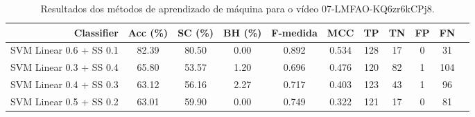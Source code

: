 \begin{table}[!htb]
\centering
\caption{Resultados dos métodos de aprendizado de máquina para o vídeo 07-LMFAO-KQ6zr6kCPj8.}
\label{tab:07-LMFAO-KQ6zr6kCPj8}
\begin{tabular}{r|c|c|c|c|c|c|c|c|c|c}
\hline\hline
Classifier & Acc (\%) & SC (\%) & BH (\%) & F-medida & MCC & TP & TN & FP & FN \\ \hline
SVM Linear 0.6 + SS 0.1 & 82.39 & 80.50 & 0.00 & 0.892 & 0.534 & 128 & 17 & 0 & 31 \\ 
SVM Linear 0.3 + SS 0.4 & 65.80 & 53.57 & 1.20 & 0.696 & 0.476 & 120 & 82 & 1 & 104 \\ 
SVM Linear 0.4 + SS 0.3 & 63.12 & 56.16 & 2.27 & 0.717 & 0.403 & 123 & 43 & 1 & 96 \\ 
SVM Linear 0.5 + SS 0.2 & 63.01 & 59.90 & 0.00 & 0.749 & 0.322 & 121 & 17 & 0 & 81 \\ 
\hline\hline
\end{tabular}
\end{table}
